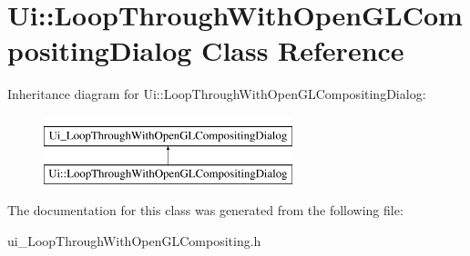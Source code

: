 \hypertarget{classUi_1_1LoopThroughWithOpenGLCompositingDialog}{
\section{Ui::LoopThroughWithOpenGLCompositingDialog Class Reference}
\label{classUi_1_1LoopThroughWithOpenGLCompositingDialog}
}
Inheritance diagram for Ui::LoopThroughWithOpenGLCompositingDialog:\begin{figure}[H]
\begin{center}
\leavevmode
\includegraphics[height=2.000000cm]{classUi_1_1LoopThroughWithOpenGLCompositingDialog}
\end{center}
\end{figure}


The documentation for this class was generated from the following file:\begin{DoxyCompactItemize}
\item 
ui\_\-LoopThroughWithOpenGLCompositing.h\end{DoxyCompactItemize}
